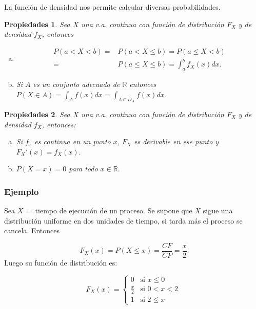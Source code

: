 \documentclass[handout]{beamer}\usepackage[]{graphicx}\usepackage[]{color}
\newcommand{\RR}{\mathbb{R}}
\renewcommand{\leq}{\leqslant}
\theoremstyle{plain}
\newtheorem{prop}{Propiedades}
\theoremstyle{definition}
\begin{document}
\begin{frame}
La función de densidad nos permite calcular diversas probabilidades.

\begin{prop} Sea $X$ una v.a. continua con función de distribución $F_X$ y de
densidad $f_X$, entonces
\begin{enumerate}[a)]
\item \begin{equation*}
\begin{split}
P(a< X< b)= & P(a<X\leq b)= P(a\leq X< b)\\
= &  P(a\leq X\leq b)= \int_{a}^b f_X(x) dx.
\end{split}
\end{equation*}
\item Si $A$ es un conjunto  adecuado de $\RR$
entonces $P(X\in A)=\int_{A} f(x) dx=\int_{A\cap D_X} f(x) dx$.
\end{enumerate}
\end{prop}
\end{frame}


\begin{frame}

\begin{prop}
Sea $X$ una v.a. continua con función de distribución $F_X$ y de densidad $f_X$, entonces:

\begin{enumerate}[a)]
\item Si $f_x$ es continua en un punto $x$, $F_X$ es derivable en ese punto y
$F_X'(x)=f_X(x).$
\item $P(X=x)=0$ para todo $x\in\RR.$
\end{enumerate}
\end{prop}
\end{frame}



\begin{frame}
\frametitle{Ejemplo}
Sea $X=$ tiempo de ejecución de un proceso. Se supone que $X$
sigue una distribución uniforme en dos unidades de tiempo,
si tarda más el proceso se cancela. Entonces

$$F_{X}(x)=P(X\leq x)=\frac{CF}{CP}=\frac{x}{2}$$
Luego su función de distribución es:



$$F_{X}(x)=\left\{\begin{array}{ll}
0 & \mbox{si } x\leq 0\\
\frac{x}{2} & \mbox{si } 0<x<2\\
1 & \mbox{si } 2\leq x
\end{array}\right.$$
\end{frame}
\end{document}
